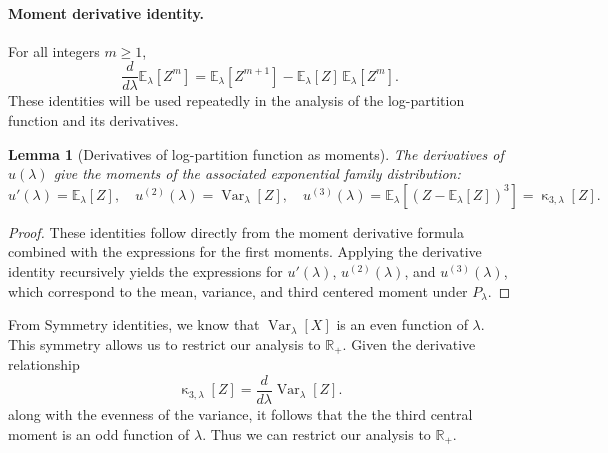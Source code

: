 \documentclass[a4paper, 10pt]{article}
\newcommand{\beq}{\begin{equation}}
\newcommand{\eeq}{\end{equation}}
\newtheorem{lemma}{Lemma}[section]
\theoremstyle{definition}
\begin{document}
\paragraph{Moment derivative identity.} For all integers \( m \geq 1 \),
    \[
    \frac{d}{d\lambda} \mathbb{E}_\lambda[Z^m] = \mathbb{E}_\lambda[Z^{m+1}] - \mathbb{E}_\lambda[Z]\,\mathbb{E}_\lambda[Z^m].
    \]
These identities will be used repeatedly in the analysis of the log-partition function and its derivatives.
\begin{lemma}[Derivatives of log-partition function as moments]\label{lem:log_partition_moments}
The derivatives of \( u(\lambda) \) give the moments of the associated exponential family distribution:
\beq
u'(\lambda) = \mathbb{E}_{\lambda}[Z], \quad u^{(2)}(\lambda) = \operatorname{Var}_{\lambda}[Z], \quad u^{(3)}(\lambda) = \mathbb{E}_{\lambda}[(Z - \mathbb{E}_{\lambda}[Z])^3] = \operatorname{\kappa}_{3,\lambda}[Z].
\eeq
\end{lemma}

\begin{proof}
These identities follow directly from the moment derivative formula combined with the expressions for the first moments. Applying the derivative identity recursively yields the expressions for \( u'(\lambda) \), \( u^{(2)}(\lambda) \), and \( u^{(3)}(\lambda) \), which correspond to the mean, variance, and third centered moment under \( P_\lambda \).
\end{proof}

From Symmetry identities, we know that  $\operatorname{Var}_{\lambda}[X]$ is an even function of $\lambda$. This symmetry allows us to restrict our analysis to $\mathbb{R}_+$. Given the derivative relationship 
 \beq \operatorname{\kappa}_{3,\lambda}[Z] = \frac{d}{d\lambda}\operatorname{Var}_{\lambda}[Z]. \eeq
along with the evenness of the variance, it follows that the the third central moment is an odd function of $\lambda$. Thus we can restrict our analysis to \( \mathbb{R}_+ \).
\end{document}
